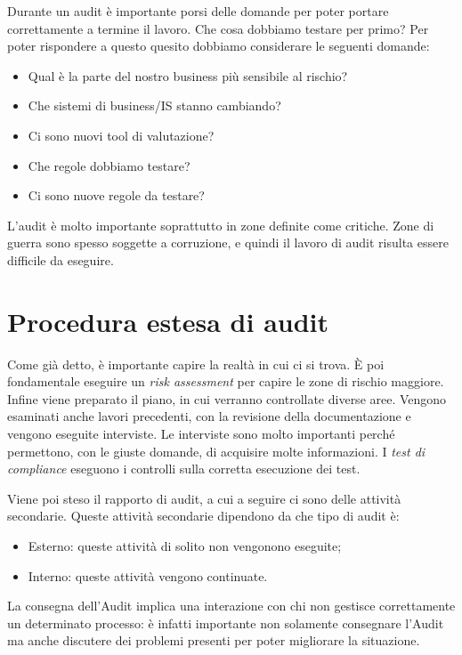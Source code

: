 Durante un audit è importante porsi delle domande per poter portare
correttamente a termine il lavoro. Che cosa dobbiamo testare per primo?
Per poter rispondere a questo quesito dobbiamo considerare le seguenti
domande:

\begin{itemize}
\item Qual è la parte del nostro business più sensibile al rischio?
\item Che sistemi di business/IS stanno cambiando?
\item Ci sono nuovi tool di valutazione?
\item Che regole dobbiamo testare?
\item Ci sono nuove regole da testare?
\end{itemize}

L'audit è molto importante soprattutto in zone definite come critiche. Zone di
guerra sono spesso soggette a corruzione, e quindi il lavoro di audit risulta
essere difficile da eseguire.

\section{Procedura estesa di audit}

Come già detto, è importante capire la realtà in cui ci si trova. È poi
fondamentale eseguire un \textit{risk assessment} per capire le zone di rischio
maggiore.
Infine viene preparato il piano, in cui verranno controllate diverse aree.
Vengono esaminati anche lavori precedenti, con la revisione della
documentazione
e vengono eseguite interviste. Le interviste sono molto importanti perché
permettono, con le giuste domande, di acquisire molte informazioni.
I \textit{test di compliance} eseguono i controlli sulla corretta esecuzione
dei
test.

Viene poi steso il rapporto di audit, a cui a seguire ci sono delle attività
secondarie. Queste attività secondarie dipendono da che tipo di audit è:
\begin{itemize}
\item Esterno: queste attività di solito non vengonono eseguite;
\item Interno: queste attività vengono continuate.
\end{itemize}

La consegna dell'Audit implica una interazione con chi non gestisce
correttamente un determinato processo: è infatti importante non solamente
consegnare l'Audit ma anche discutere dei problemi presenti per poter
migliorare
la situazione.

